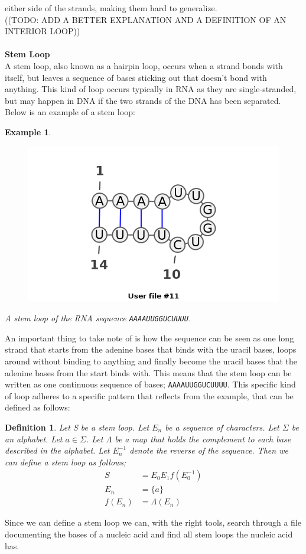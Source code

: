 \documentclass{article}
\newtheorem{myex}{Example}
\newtheorem{mydef}{Definition}
\begin{document}
either side of the strands, making them hard to generalize.\\
((TODO: ADD A BETTER EXPLANATION AND A DEFINITION OF AN INTERIOR LOOP))
\\\\
\textbf{Stem Loop}\\
A stem loop, also known as a hairpin loop, occurs when a strand bonds with 
itself, but leaves a sequence of bases sticking out that doesn't bond with anything. 
This kind of loop occurs typically in RNA as they are single-stranded, but may 
happen in DNA if the two strands of the DNA has been separated. Below is an 
example of a stem loop:\newpage
\begin{myex}\centering
\begin{figure}[h]
\includegraphics[scale=0.5]{stem-loop.png}
\end{figure}
A stem loop of the RNA sequence {\tt AAAAUUGGUCUUUU}.
\end{myex}
An important thing to take note of is how the sequence can be seen as one 
long strand that starts from the adenine bases that binds with the uracil bases, 
loops around without binding to anything and finally become the uracil bases 
that the adenine bases from the start binds with. This means that the 
stem loop can be written as one continuous sequence of bases; {\tt AAAAUUGGUCUUUU}. 
This specific kind of loop adheres to a specific pattern that reflects from 
the example, that can be defined as follows:
\begin{mydef}
\centering
Let S be a stem loop. Let $E_n$ be a sequence of characters. Let $\Sigma$ be an alphabet. Let 
$a \in \Sigma$. Let $\Lambda$ be a map that holds the complement to each base 
described in the alphabet. Let $E_n^{-1}$
denote the reverse of the sequence. Then we can define a stem loop as follows;
\begin{align*}
S      &= E_0 E_1 f(E_0^{-1}) \\
E_n    &= \{a\}\\
f(E_n) &= \Lambda(E_n)
\end{align*}
\end{mydef}
Since we can define a stem loop we can, with the right tools, search through 
a file documenting the bases of a nucleic acid and find all stem loops 
the nucleic acid has.
\end{document}

